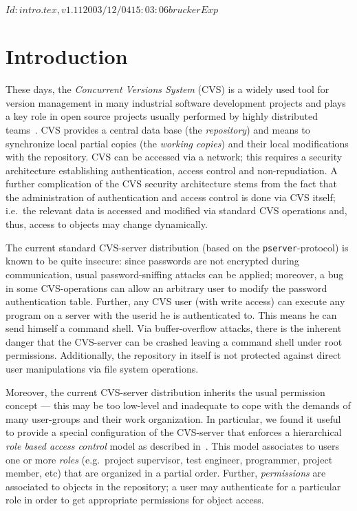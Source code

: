 \rcsInfo $Id: intro.tex,v 1.11 2003/12/04 15:03:06 brucker Exp $

\chapter{Introduction}\label{chapter:introduction}
These days, the \emph{Concurrent Versions System} (CVS) is a widely used tool for
version management in many industrial software development projects
and plays a key role in open source projects usually performed by
highly distributed
teams~\cite{cederqvist.ea:cvs:2000,fogel:cvs:1999,cvshome:2001}.  CVS
provides a central data base (the \emph{repository})
and means to synchronize local partial copies (the \emph{working
  copies}) and their local modifications with the
repository. CVS can be accessed via a network; this
requires a security architecture establishing authentication, access
control and non-repudiation.  A further complication of the CVS
security architecture stems from the fact that the administration of
authentication and access control is done via CVS itself; i.e.\ the
relevant data is accessed and modified via standard CVS operations
and, thus, access to objects may change dynamically.
 
The current standard CVS-server distribution (based on the
\texttt{pserver}-protocol) is known to
be quite insecure: since passwords are not encrypted during
communication, usual password-sniffing attacks can be applied;
moreover, a bug in some CVS-operations can allow an arbitrary user to
modify the password authentication table.  Further, any CVS user (with
write access) can execute any program on a server with the userid he
is authenticated to. This means he can send himself a command shell.
Via buffer-overflow attacks, there is the inherent danger that the
CVS-server can be crashed leaving a command shell under root
permissions.  Additionally, the repository in itself is not protected
against direct user manipulations via file system operations.

Moreover, the current CVS-server distribution inherits the usual \unix{}
permission concept --- this may be too low-level and
inadequate to cope with the demands of many user-groups and their work
organization. In particular, we found it useful to provide a special
configuration of the CVS-server that enforces a hierarchical \emph{role based
  access control} model as described
in~\cite{sandhu.ea:role-based:1996}. This model associates to users one or more
\emph{roles} (e.g.\ project supervisor, test engineer, programmer, project
member, etc) that are organized in a partial order. Further, \emph{permissions}
are associated to objects in the repository; a user may authenticate for a
particular role in order to get appropriate permissions for object access.

